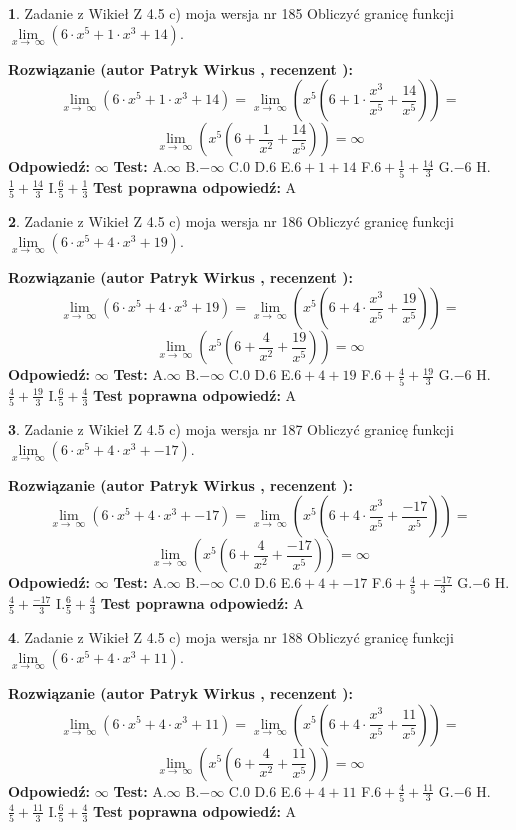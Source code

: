 \documentclass[12pt, a4paper]{article}
\theoremstyle{definition} %
\newtheorem{zad}{}
\newcommand{\zadStart}[1]{\begin{zad}#1\newline}
\newcommand{\zadStop}{\end{zad}}
\newcommand{\rozwStart}[2]{\noindent \textbf{Rozwiązanie (autor #1 , recenzent #2): }\newline}
\newcommand{\rozwStop}{\newline}
\newcommand{\odpStart}{\noindent \textbf{Odpowiedź:}\newline}
\newcommand{\odpStop}{\newline}
\newcommand{\testStart}{\noindent \textbf{Test:}\newline}
\newcommand{\testStop}{\newline}
\newcommand{\kluczStart}{\noindent \textbf{Test poprawna odpowiedź:}\newline}
\newcommand{\kluczStop}{\newline}
\begin{document}
\zadStart{Zadanie z Wikieł Z 4.5 c) moja wersja nr 185}
Obliczyć granicę funkcji  $\lim\limits_{x\to\ \infty}(6 \cdot x^{5}+1 \cdot x^{3}+14)$.
\zadStop
\rozwStart{Patryk Wirkus}{}
$$\lim\limits_{x\to\ \infty}(6 \cdot x^{5}+1 \cdot x^{3}+14) = \lim\limits_{x\to\ \infty}(x^{5}(6 +1 \cdot \frac{x^{3}}{x^{5}}+\frac{14}{x^{5}})) =$$ $$\lim\limits_{x\to\ \infty}(x^{5}(6 +\frac{1}{x^{2}}+\frac{14}{x^{5}})) =\infty$$
\rozwStop
\odpStart
$\infty$
\odpStop
\testStart
A.$\infty$ B.$-\infty$ C.$0$ D.$6$ E.$6 + 1 + 14$
F.$6+\frac{1}{5}+\frac{14}{3}$ G.$-6$
H.$\frac{1}{5}+\frac{14}{3}$
I.$\frac{6}{5}+\frac{1}{3}$
\testStop
\kluczStart
A
\kluczStop



\zadStart{Zadanie z Wikieł Z 4.5 c) moja wersja nr 186}
Obliczyć granicę funkcji  $\lim\limits_{x\to\ \infty}(6 \cdot x^{5}+4 \cdot x^{3}+19)$.
\zadStop
\rozwStart{Patryk Wirkus}{}
$$\lim\limits_{x\to\ \infty}(6 \cdot x^{5}+4 \cdot x^{3}+19) = \lim\limits_{x\to\ \infty}(x^{5}(6 +4 \cdot \frac{x^{3}}{x^{5}}+\frac{19}{x^{5}})) =$$ $$\lim\limits_{x\to\ \infty}(x^{5}(6 +\frac{4}{x^{2}}+\frac{19}{x^{5}})) =\infty$$
\rozwStop
\odpStart
$\infty$
\odpStop
\testStart
A.$\infty$ B.$-\infty$ C.$0$ D.$6$ E.$6 + 4 + 19$
F.$6+\frac{4}{5}+\frac{19}{3}$ G.$-6$
H.$\frac{4}{5}+\frac{19}{3}$
I.$\frac{6}{5}+\frac{4}{3}$
\testStop
\kluczStart
A
\kluczStop



\zadStart{Zadanie z Wikieł Z 4.5 c) moja wersja nr 187}
Obliczyć granicę funkcji  $\lim\limits_{x\to\ \infty}(6 \cdot x^{5}+4 \cdot x^{3}+-17)$.
\zadStop
\rozwStart{Patryk Wirkus}{}
$$\lim\limits_{x\to\ \infty}(6 \cdot x^{5}+4 \cdot x^{3}+-17) = \lim\limits_{x\to\ \infty}(x^{5}(6 +4 \cdot \frac{x^{3}}{x^{5}}+\frac{-17}{x^{5}})) =$$ $$\lim\limits_{x\to\ \infty}(x^{5}(6 +\frac{4}{x^{2}}+\frac{-17}{x^{5}})) =\infty$$
\rozwStop
\odpStart
$\infty$
\odpStop
\testStart
A.$\infty$ B.$-\infty$ C.$0$ D.$6$ E.$6 + 4 + -17$
F.$6+\frac{4}{5}+\frac{-17}{3}$ G.$-6$
H.$\frac{4}{5}+\frac{-17}{3}$
I.$\frac{6}{5}+\frac{4}{3}$
\testStop
\kluczStart
A
\kluczStop



\zadStart{Zadanie z Wikieł Z 4.5 c) moja wersja nr 188}
Obliczyć granicę funkcji  $\lim\limits_{x\to\ \infty}(6 \cdot x^{5}+4 \cdot x^{3}+11)$.
\zadStop
\rozwStart{Patryk Wirkus}{}
$$\lim\limits_{x\to\ \infty}(6 \cdot x^{5}+4 \cdot x^{3}+11) = \lim\limits_{x\to\ \infty}(x^{5}(6 +4 \cdot \frac{x^{3}}{x^{5}}+\frac{11}{x^{5}})) =$$ $$\lim\limits_{x\to\ \infty}(x^{5}(6 +\frac{4}{x^{2}}+\frac{11}{x^{5}})) =\infty$$
\rozwStop
\odpStart
$\infty$
\odpStop
\testStart
A.$\infty$ B.$-\infty$ C.$0$ D.$6$ E.$6 + 4 + 11$
F.$6+\frac{4}{5}+\frac{11}{3}$ G.$-6$
H.$\frac{4}{5}+\frac{11}{3}$
I.$\frac{6}{5}+\frac{4}{3}$
\testStop
\kluczStart
A
\kluczStop
\end{document}
